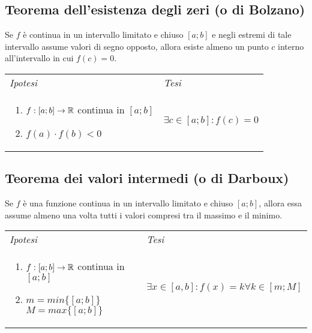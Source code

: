 \documentclass{book}     %
\begin{document}
    \subsection{Teorema dell'esistenza degli zeri (o di Bolzano)}
        \begin{shadedTheorem}[Bolzano]
            Se $f$ è continua in un intervallo limitato e chiuso $[a;b]$ e negli estremi di tale intervallo assume valori di segno opposto, allora esiste almeno un punto $c$ interno all'intervallo in cui $f(c)=0$.
        \end{shadedTheorem}
        \begin{tabular}{m{}m{}}
            \textit{Ipotesi} & \textit{Tesi}  \\
            \begin{enumerate}
                \item $f: [a;b] \to \mathbb{R}$ continua in $[a;b]$
                \item $f(a) \cdot f(b)<0$
            \end{enumerate} & $\exists c \in [a;b]:f(c)=0$ 
        \end{tabular}
    
    \subsection{Teorema dei valori intermedi (o di Darboux)}
        \begin{shadedTheorem}[Darbaux]
            Se $f$ è una funzione continua in un intervallo limitato e chiuso $[a;b]$, allora essa assume almeno una volta tutti i valori compresi tra il massimo e il minimo.
        \end{shadedTheorem}
        \begin{tabular}{m{}m{}}
            \textit{Ipotesi} & \textit{Tesi}  \\
            \begin{enumerate}
                \item $f: [a;b]\to \mathbb{R}$ continua in $[a;b]$
                \item $m=min\{[a;b]\}$ ~~~ $M=max\{[a;b]\}$
            \end{enumerate} & $\exists x \in [a,b] : f(x)=k \forall k \in [m;M]$
        \end{tabular}


\end{document}
